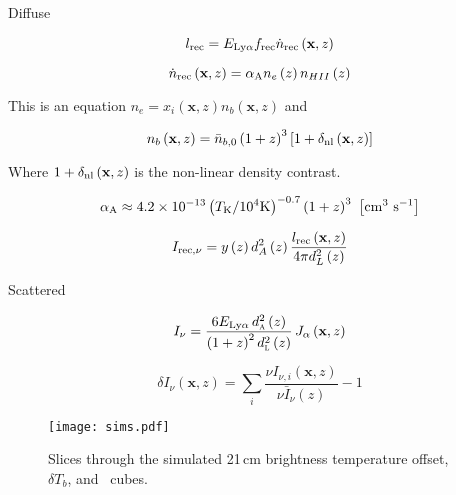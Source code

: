 Diffuse

\begin{equation}
  l_{\rm rec} = E_{\rm Ly\alpha} f_{\rm rec} \dot{n}_{\rm rec} \left( \textbf{x}, z \right)
\end{equation}

\begin{equation}
  \dot{n}_{\rm rec} \left( \textbf{x}, z \right) = \alpha_{\rm A} n_{e} \left(z \right) n_{HII} \left(z \right)
\end{equation}

This is an equation $n_{e} = x_i \left( \textbf{x}, z \right) n_{b} \left( \textbf{x}, z \right) $ and


\begin{equation}
  n_{b} \left( \textbf{x}, z \right) = \bar{n}_{b, 0} \left( 1 + z\right)^3 \left[1 + \delta_{\rm nl} \left( \textbf{x}, z\right) \right]
\end{equation}

Where $1 + \delta_{\rm nl} \left( \textbf{x}, z\right)$ is the non-linear density contrast.

\begin{equation}
  \alpha_{\rm A} \approx 4.2 \times 10^{-13} \left( T_{\rm K} / 10^4 {\rm K} \right)^{-0.7} \left( 1 + z\right)^3 \ \left[\rm  cm^3 \ s^{-1} \right]
\end{equation}

\begin{equation}
I_{\rm rec, \nu} = y \left(z \right) d_A^2 \left(z \right) \frac{l_{\rm rec} \left( \textbf{x}, z \right)}{4 \pi d_L^2 \left( z \right)}
\end{equation}

Scattered

\begin{equation}
  I_{\nu} = \frac{6 E_{\text{Ly}\alpha}\, d_\textsc{a}^2 \left(z \right)}{\left( 1 + z\right)^2 d_\textsc{l}^2 \left( z \right)}\, J_{\alpha} \left( \textbf{x}, z \right)
\end{equation}

\begin{equation}
  \delta I_{\nu} \left(\textbf{x}, z \right) = \sum_i \frac{\nu I_{\nu, i} \left(\textbf{x}, z \right)}{\nu \bar{I}_{\nu} \left(z \right)} - 1
\end{equation}

\begin{figure}[ht]
	\centering
	\texttt{[image: sims.pdf]}
	\caption[Simulated 21cm and \lya\ emission]{Slices through the simulated 21\,cm brightness temperature offset, $\delta T_b$, and \lya\ cubes.}
	\label{fig:sims}
\end{figure}
